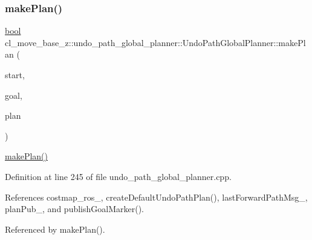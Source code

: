 \subsubsection{\texorpdfstring{make\+Plan()}{makePlan()}\hspace{0.1cm}{\footnotesize\ttfamily [1/2]}}
{\footnotesize\ttfamily \hyperlink{classbool}{bool} cl\+\_\+move\+\_\+base\+\_\+z\+::undo\+\_\+path\+\_\+global\+\_\+planner\+::\+Undo\+Path\+Global\+Planner\+::make\+Plan (\begin{DoxyParamCaption}\item[{const geometry\+\_\+msgs\+::\+Pose\+Stamped \&}]{start,  }\item[{const geometry\+\_\+msgs\+::\+Pose\+Stamped \&}]{goal,  }\item[{std\+::vector$<$ geometry\+\_\+msgs\+::\+Pose\+Stamped $>$ \&}]{plan }\end{DoxyParamCaption})}

\hyperlink{classcl__move__base__z_1_1undo__path__global__planner_1_1UndoPathGlobalPlanner_a46034d27c0811abae440009457a7f8b0}{make\+Plan()} 

Definition at line 245 of file undo\+\_\+path\+\_\+global\+\_\+planner.\+cpp.



References costmap\+\_\+ros\+\_\+, create\+Default\+Undo\+Path\+Plan(), last\+Forward\+Path\+Msg\+\_\+, plan\+Pub\+\_\+, and publish\+Goal\+Marker().



Referenced by make\+Plan().


